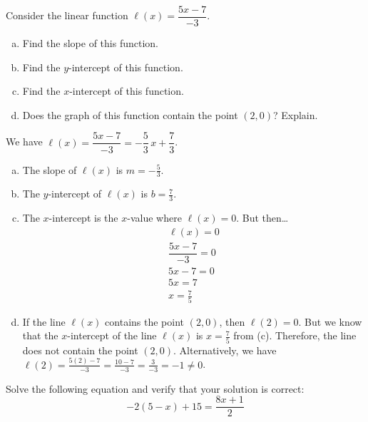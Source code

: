 \documentclass[11pt,letterpaper]{article}
\begin{document}

 Consider the linear function $\ell(x)= \dfrac{5x - 7}{-3}$. 
	\begin{enumerate}[(a)]
	\item Find the slope of this function.
	\item Find the $y$-intercept of this function.
	\item Find the $x$-intercept of this function.
	\item Does the graph of this function contain the point $(2, 0)$? Explain. 
	\end{enumerate} \pspace

\sol We have $\ell(x)= \dfrac{5x - 7}{-3}= -\dfrac{5}{3}\, x + \dfrac{7}{3}$. 

\begin{enumerate}[(a)]
\item The slope of $\ell(x)$ is $m= -\frac{5}{3}$. \pspace

\item The $y$-intercept of $\ell(x)$ is $b= \frac{7}{3}$. \pspace

\item The $x$-intercept is the $x$-value where $\ell(x)= 0$. But then\dots
	\[
	\begin{gathered}
	\ell(x)= 0 \\[0.3cm]
	 \dfrac{5x - 7}{-3}= 0 \\[0.3cm]
	 5x - 7= 0 \\[0.3cm]
	 5x= 7 \\[0.3cm]
	 x= \frac{7}{5}
	\end{gathered}
	\] \pspace

\item If the line $\ell(x)$ contains the point $(2, 0)$, then $\ell(2)= 0$. But we know that the $x$-intercept of the line $\ell(x)$ is $x= \frac{7}{5}$ from (c). Therefore, the line does not contain the point $(2, 0)$. Alternatively, we have $\ell(2)= \frac{5(2) - 7}{-3}= \frac{10 - 7}{-3}= \frac{3}{-3}= -1 \neq 0$. 
\end{enumerate}



\newpage



 Solve the following equation and verify that your solution is correct:
	\[
	-2(5 - x) + 15= \dfrac{8x + 1}{2}
	\] \pspace
\end{document}

